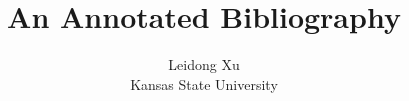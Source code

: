 \documentclass [11pt]{article}
\title{An Annotated Bibliography}
\author{Leidong Xu\\Kansas State University}
\begin{document}
\maketitle
\nocite{*}


\end{document}
